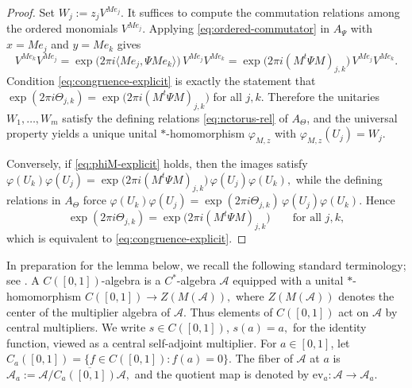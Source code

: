 \documentclass[11pt]{amsart}
\theoremstyle{definition}
\theoremstyle{remark}
\newcommand{\ev}{\mathrm{ev}}
\begin{document}
\begin{proof}
Set $W_j:=z_jV^{Me_j}$.
It suffices to compute the commutation relations among the ordered monomials $V^{Me_j}$.
Applying \eqref{eq:ordered-commutator} in $A_{\Psi}$ with $x=Me_j$ and $y=Me_k$ gives
\[
V^{Me_k}V^{Me_j}
=
\exp\bigl(2\pi i\langle Me_j,\Psi Me_k\rangle\bigr)\,V^{Me_j}V^{Me_k}
=
\exp\bigl(2\pi i(M^t\Psi M)_{j,k}\bigr)\,V^{Me_j}V^{Me_k}.
\]
Condition \eqref{eq:congruence-explicit} is exactly the statement that $\exp(2\pi i\Theta_{j,k})=\exp\bigl(2\pi i(M^t\Psi M)_{j,k}\bigr)$
for all $j,k$. Therefore the unitaries $W_1,\dots,W_m$ satisfy the defining relations \eqref{eq:nctorus-rel} of $A_{\Theta}$, and the universal property yields a unique unital $*$-homomorphism $\varphi_{M,z}$ with $\varphi_{M,z}(U_j)=W_j$.

Conversely, if \eqref{eq:phiM-explicit} holds, then the images satisfy $\varphi(U_k)\varphi(U_j)=\exp\bigl(2\pi i(M^t\Psi M)_{j,k}\bigr)\,\varphi(U_j)\varphi(U_k),$
while the defining relations in $A_{\Theta}$ force $\varphi(U_k)\varphi(U_j)
=
\exp(2\pi i\Theta_{j,k})\,\varphi(U_j)\varphi(U_k).$
Hence
\[
\exp(2\pi i\Theta_{j,k})
=
\exp\bigl(2\pi i(M^t\Psi M)_{j,k}\bigr)
\qquad\text{for all }j,k,
\]
which is equivalent to \eqref{eq:congruence-explicit}.
\end{proof}


In preparation for the lemma below, we recall the following standard terminology; see
\cite{BlanchardTensorCX,WilliamsCrossedProducts}. A $C([0,1])$-algebra
is a $C^*$-algebra $\mathcal A$ equipped with a unital $*$-homomorphism $C([0,1])\longrightarrow Z(M(\mathcal A)),$
where $Z(M(\mathcal A))$ denotes the center of the multiplier algebra of
$\mathcal A$. Thus elements of $C([0,1])$ act on $\mathcal A$ by central
multipliers. We write $s\in C([0,1])$, $s(a)=a,$
for the identity function, viewed as a central self-adjoint multiplier. For
$a\in[0,1]$, let $C_a([0,1])=\{f\in C([0,1]):f(a)=0\}.$
The fiber of $\mathcal A$ at $a$ is $\mathcal A_a:=\mathcal A/\overline{C_a([0,1])\mathcal A},$
and the quotient map is denoted by $\ev_a\colon \mathcal A\to \mathcal A_a.$
\end{document}
